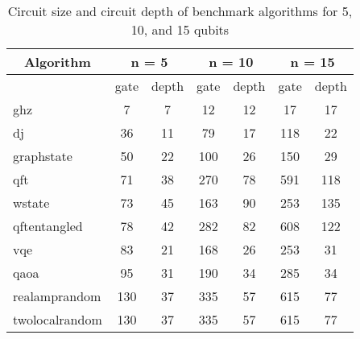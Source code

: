 \begin{table}[htb]
\centering
\caption{Circuit size and circuit depth of benchmark algorithms for 5, 10, and 15 qubits}
\label{tab:table-algorithm-size-depth}
\begin{tabular}{|l|c|c|c|c|c|c|} 
\hline
\multicolumn{1}{|c|}{\textbf{Algorithm}} & \multicolumn{2}{c|}{\textbf{n = 5}} & \multicolumn{2}{c|}{\textbf{n = 10}} & \multicolumn{2}{c|}{\textbf{n = 15}}  \\ 
\hline
\multicolumn{1}{|c|}{\textbf{}}          & gate & depth                        & gate & depth                         & gate & depth                          \\ 
\hline
ghz                                      & 7    & 7                            & 12   & 12                            & 17   & 17                             \\ 
\hline
dj                                       & 36   & 11                           & 79   & 17                            & 118  & 22                             \\ 
\hline
graphstate                               & 50   & 22                           & 100  & 26                            & 150  & 29                             \\ 
\hline
qft                                      & 71   & 38                           & 270  & 78                            & 591  & 118                            \\ 
\hline
wstate                                   & 73   & 45                           & 163  & 90                            & 253  & 135                            \\ 
\hline
qftentangled                             & 78   & 42                           & 282  & 82                            & 608  & 122                            \\ 
\hline
vqe                                      & 83   & 21                           & 168  & 26                            & 253  & 31                             \\ 
\hline
qaoa                                     & 95   & 31                           & 190  & 34                            & 285  & 34                             \\ 
\hline
realamprandom                            & 130  & 37                           & 335  & 57                            & 615  & 77                             \\ 
\hline
twolocalrandom                           & 130  & 37                           & 335  & 57                            & 615  & 77                             \\ 

\end{tabular}
\end{table}

